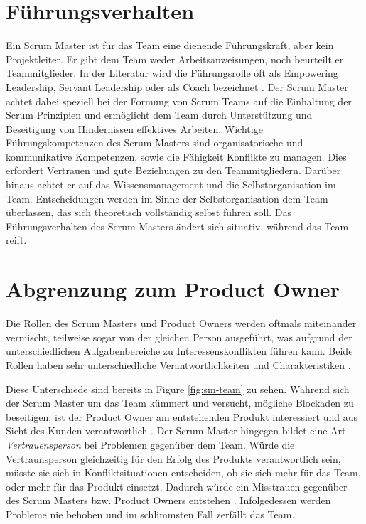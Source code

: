 \documentclass[5pt, final]{beamer}
\begin{document}
\begin{frame}[t]
\begin{multicols}{3}
			\section {Führungsverhalten}
            
            Ein Scrum Master ist für das Team eine dienende Führungskraft, aber kein Projektleiter. Er gibt dem Team weder Arbeitsanweisungen, noch beurteilt er Teammitglieder. In der Literatur wird die Führungsrolle oft als Empowering Leadership, Servant Leadership oder als Coach bezeichnet \cite{Spiegler21}\cite{Frye24}. Der Scrum Master achtet dabei speziell bei der Formung von Scrum Teams auf die Einhaltung der Scrum Prinzipien und ermöglicht dem Team durch Unterstützung und Beseitigung von Hindernissen effektives Arbeiten. 
            Wichtige Führungskompetenzen des Scrum Masters sind organisatorische und kommunikative Kompetenzen, sowie die Fähigkeit Konflikte zu managen. Dies erfordert Vertrauen und gute Beziehungen zu den Teammitgliedern. Darüber hinaus achtet er auf das Wissensmanagement und die Selbstorganisation im Team.\cite{Frye24} 
            Entscheidungen werden im Sinne der Selbstorganisation dem Team überlassen, das sich theoretisch vollständig selbst führen soll. Das Führungsverhalten des Scrum Masters ändert sich situativ, während das Team reift. \cite{Spiegler21}
			
			\section{Abgrenzung zum Product Owner}
			
            Die Rollen des Scrum Masters und Product Owners werden oftmals miteinander vermischt, teilweise sogar von der gleichen Person ausgeführt, was aufgrund der unterschiedlichen Aufgabenbereiche zu Interessenskonflikten führen kann. %
            Beide Rollen haben sehr unterschiedliche Verantwortlichkeiten und Charakteristiken \cite{sutherland14}.
            
            Diese Unterschiede sind bereits in Figure \ref{fig:sm-team} zu sehen.
            Während sich der Scrum Master um das Team kümmert und versucht, mögliche Blockaden zu beseitigen, ist der Product Owner am entstehenden Produkt interessiert und aus Sicht des Kunden verantwortlich \cite{Spiegler21}.         
            Der Scrum Master hingegen bildet eine Art \textit{Vertrauensperson} bei Problemen gegenüber dem Team.
            Würde die Vertraunsperson gleichzeitig für den Erfolg des Produkts verantwortlich sein, müsste sie sich in Konfliktsituationen entscheiden, ob sie sich mehr für das Team, oder mehr für das Produkt einsetzt.
            Dadurch würde ein Misstrauen gegenüber des Scrum Masters bzw. Product Owners entstehen \cite{me-company}. Infolgedessen werden Probleme nie behoben und im schlimmsten Fall zerfällt das Team.
			

\end{multicols}
\end{frame}
\end{document}
